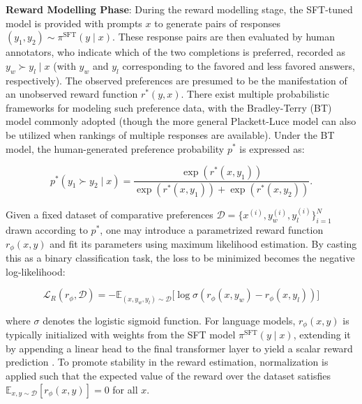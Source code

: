 \textbf{Reward Modelling Phase}: During the reward modelling stage, the SFT-tuned model is provided with prompts $x$ to generate pairs of responses $(y_1, y_2)\sim \pi^\text{SFT}(y \mid x)$. These response pairs are then evaluated by human annotators, who indicate which of the two completions is preferred, recorded as $y_w\succ y_l \mid x$ (with $y_w$ and $y_l$ corresponding to the favored and less favored answers, respectively). The observed preferences are presumed to be the manifestation of an unobserved reward function $r^*(y, x)$. There exist multiple probabilistic frameworks for modeling such preference data, with the Bradley-Terry (BT) model \cite{bradley1952rankanalysis} commonly adopted (though the more general Plackett-Luce model \citep{plackett1975analysis, luce2012individual} can also be utilized when rankings of multiple responses are available). Under the BT model, the human-generated preference probability $p^*$ is expressed as:

\begin{equation}\label{eq:bradley-terry}
    p^*(y_1\succ y_2 \mid x)=\frac{\exp\left(r^*(x, y_1)\right)}{\exp\left(r^*(x, y_1)\right) + \exp\left(r^*(x, y_2)\right)}.
\end{equation}

Given a fixed dataset of comparative preferences $\mathcal{D}=\bigl\{x^{(i)}, y_w^{(i)}, y_l^{(i)}\bigr\}_{i=1}^N$ drawn according to $p^*$, one may introduce a parametrized reward function $r_{\phi}(x, y)$ and fit its parameters using maximum likelihood estimation. By casting this as a binary classification task, the loss to be minimized becomes the negative log-likelihood:

\begin{equation}\label{eq:reward_model}
    \mathcal{L}_R(r_{\phi}, \mathcal{D}) = -\mathbb{E}_{(x, y_w, y_l)\sim \mathcal{D}}\bigl[\log \sigma(r_{\phi}(x, y_w)- r_{\phi}(x, y_l))\bigr]
\end{equation}

where $\sigma$ denotes the logistic sigmoid function. For language models, $r_{\phi}(x, y)$ is typically initialized with weights from the SFT model $\pi^\text{SFT}(y \mid x)$, extending it by appending a linear head to the final transformer layer to yield a scalar reward prediction \cite{ziegler2020finetuning}. To promote stability in the reward estimation, normalization is applied such that the expected value of the reward over the dataset satisfies $\mathbb{E}_{x,y\sim \mathcal{D}}\left[r_\phi(x, y)\right] = 0$ for all $x$.

